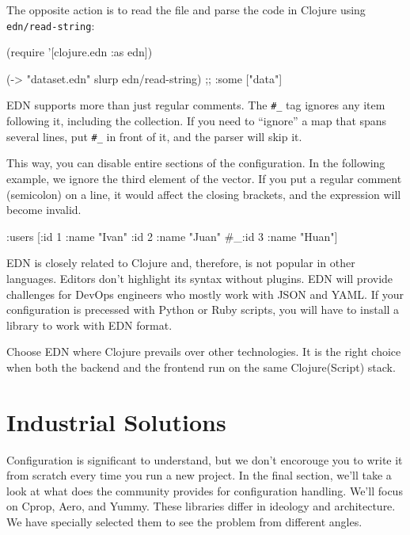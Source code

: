 The opposite action is to read the file and parse the code in Clojure using \verb|edn/read-string|:

\begin{english}
  \begin{clojure}
(require '[clojure.edn :as edn])

(-> "dataset.edn" slurp edn/read-string)
;; {:some ["data"]}
  \end{clojure}
\end{english}


EDN supports more than just regular comments. The \verb|#_| tag ignores any item following it, including the collection. If you need to ``ignore'' a map that spans several lines, put \verb|#_| in front of it, and the parser will skip it.


This way, you can disable entire sections of the configuration. In the following example, we ignore the third element of the vector. If you put a regular comment (semicolon) on a line, it would affect the closing brackets, and the expression will become invalid.

\begin{clojure}
{:users [{:id 1 :name "Ivan"}
         {:id 2 :name "Juan"}
         #_{:id 3 :name "Huan"}]}
\end{clojure}

EDN is closely related to Clojure and, therefore, is not popular in other languages. Editors don't highlight its syntax without plugins. EDN will provide challenges for DevOps engineers who mostly work with JSON and YAML. If your configuration is precessed with Python or Ruby scripts, you will have to install a library to work with EDN format.

Choose EDN where Clojure prevails over other technologies. It is the right choice when both the backend and the frontend run on the same Clojure(Script) stack.

\section{Industrial Solutions}

Configuration is significant to understand, but we don't encorouge you to write it from scratch every time you run a new project. In the final section, we'll take a look at what does the community provides for configuration handling. We'll focus on Cprop, Aero, and Yummy. These libraries differ in ideology and architecture. We have specially selected them to see the problem from different angles.

